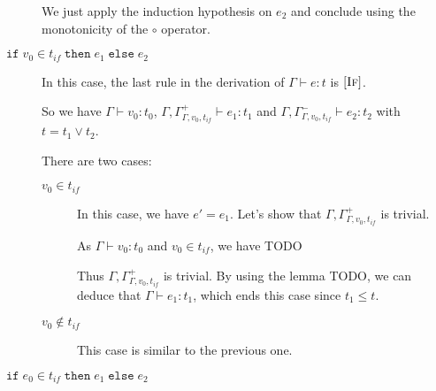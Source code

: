 \documentclass[a4paper]{article}%
\newcommand{\ite}[4]{\ensuremath{\texttt{if}\;#1\in#2\;\texttt{then}\;#3\;\texttt{else}\;#4}}
\theoremstyle{definition}
\newcommand {\Rule}[1] {[\textsc{#1}]}
\begin{document}
\begin{description}
      We just apply the induction hypothesis on $e_2$ and conclude using the monotonicity of the $\circ$ operator.
      \item[$\ite {v_0} {t_{if}} {e_1} {e_2}$] In this case, the last rule in the derivation of $\Gamma \vdash e:t$ is $\Rule{If}$.
       
      So we have $\Gamma \vdash v_0 : t_0$, $\Gamma, \Gamma^+_{\Gamma,v_0,t_{if}}\vdash e_1 : t_1$ and $\Gamma, \Gamma^-_{\Gamma,v_0,t_{if}}\vdash e_2 : t_2$ with $t=t_1\vee t_2$.

      There are two cases:
      \begin{description}
        \item[$v_0 \in t_{if}$] In this case, we have $e'=e_1$.
        Let's show that $\Gamma, \Gamma^+_{\Gamma,v_0,t_{if}}$ is trivial.

        As $\Gamma \vdash v_0 : t_0$ and $v_0 \in t_{if}$, we have TODO

        Thus $\Gamma, \Gamma^+_{\Gamma,v_0,t_{if}}$ is trivial.
        By using the lemma TODO, we can deduce that $\Gamma \vdash e_1 : t_1$, which ends this case since $t_1 \leq t$.
        \item[$v_0 \not\in t_{if}$] This case is similar to the previous one.
      \end{description}
        
      \item[$\ite {e_0} {t_{if}} {e_1} {e_2}$]
    \end{description}
\end{document}
